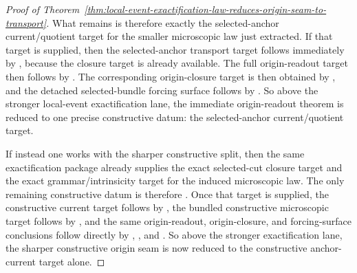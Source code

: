 \begin{proof}[Proof of Theorem~\ref{thm:local-event-exactification-law-reduces-origin-seam-to-transport}]
What remains is therefore exactly the selected-anchor current/quotient target
 for the smaller microscopic law
just extracted. If that target is supplied, then the selected-anchor transport
target follows immediately by
,
because the closure target is already available. The full origin-readout target
then follows by
.
The corresponding origin-closure target is then obtained by
,
and the detached selected-bundle forcing surface follows by
.
So above the stronger local-event exactification lane, the immediate
origin-readout theorem is reduced to one precise constructive datum: the
selected-anchor current/quotient target.

If instead one works with the sharper constructive split, then the same
exactification package already supplies the exact selected-cut closure target
and the exact grammar/intrinsicity target for the induced microscopic law.
The only remaining constructive datum is therefore
. Once that target is
supplied, the constructive current target follows by
,
the bundled constructive microscopic target follows by
,
and the same origin-readout, origin-closure, and forcing-surface conclusions
follow directly by
,
,
and
.
So above the stronger exactification lane, the sharper constructive origin
seam is now reduced to the constructive anchor-current target alone.
\end{proof}

